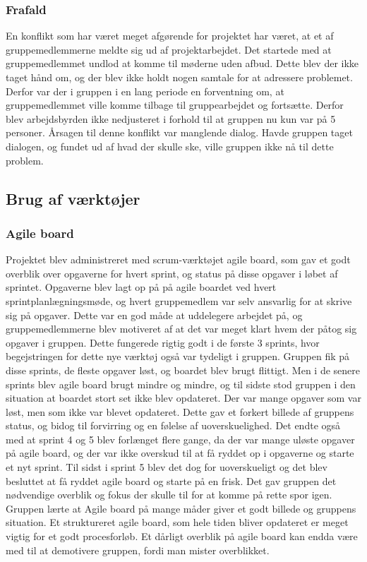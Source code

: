 \subsubsection{Frafald}
En konflikt som har været meget afgørende for projektet har været, at et af gruppemedlemmerne meldte sig ud af projektarbejdet. Det startede med at gruppemedlemmet undlod at komme til møderne uden afbud. Dette blev der ikke taget hånd om, og der blev ikke holdt nogen samtale for at adressere problemet. Derfor var der i gruppen i en lang periode en forventning om, at gruppemedlemmet ville komme tilbage til gruppearbejdet og fortsætte. Derfor blev arbejdsbyrden ikke nedjusteret i forhold til at gruppen nu kun var på 5 personer. Årsagen til denne konflikt var manglende dialog. Havde gruppen taget dialogen, og fundet ud af hvad der skulle ske, ville gruppen ikke nå til dette problem.

\subsection{Brug af værktøjer}
\subsubsection{Agile board}
Projektet blev administreret med scrum-værktøjet agile board, som gav et godt overblik over opgaverne for hvert sprint, og status på disse opgaver
i løbet af sprintet. Opgaverne blev lagt op på på agile boardet ved hvert sprintplanlægningsmøde, og hvert gruppemedlem var selv ansvarlig for at skrive sig på opgaver. Dette var en god måde at uddelegere arbejdet på, og gruppemedlemmerne blev motiveret af at det var meget klart hvem der påtog sig opgaver i gruppen. Dette fungerede rigtig godt i de første 3 sprints, hvor begejstringen for dette nye værktøj også var tydeligt i gruppen. Gruppen fik på disse sprints, de fleste opgaver løst, og boardet blev brugt flittigt. Men i de senere sprints blev agile board brugt mindre og mindre, og til sidste stod gruppen i den situation at boardet stort set ikke blev opdateret. Der var mange opgaver som var løst, men som ikke var blevet opdateret. Dette gav et forkert billede af gruppens status, og bidog til forvirring og en følelse af uoverskuelighed. Det endte også med at sprint 4 og 5 blev forlænget flere gange, da der var mange uløste opgaver på agile board, og der var ikke overskud til at få ryddet op i opgaverne og starte et nyt sprint. Til sidst i sprint 5 blev det dog for uoverskueligt og det blev besluttet at få ryddet agile board og starte på en frisk. Det gav gruppen det nødvendige overblik og fokus der skulle til for at komme på rette spor igen. Gruppen lærte at Agile board på mange måder giver et godt billede og gruppens situation. Et struktureret agile board, som hele tiden bliver opdateret er meget vigtig for et godt procesforløb. Et dårligt overblik på agile board kan endda være med til at demotivere gruppen, fordi man mister overblikket.  
 
